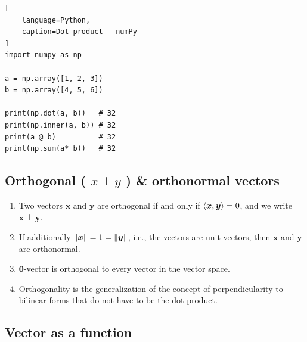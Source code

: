 \begin{lstlisting}[
    language=Python,
    caption=Dot product - numPy
]
import numpy as np

a = np.array([1, 2, 3])
b = np.array([4, 5, 6])

print(np.dot(a, b))   # 32
print(np.inner(a, b)) # 32
print(a @ b)          # 32
print(np.sum(a* b))   # 32
\end{lstlisting}











\subsection{Orthogonal ( $x \perp y$ ) \& orthonormal vectors}

\begin{enumerate}
    \item
    \begin{definition}
        Two vectors $\bm{x}$ and $\bm{y}$ are orthogonal if and only if $\langle\bm{x}, \bm{y}\rangle = 0$, and we write $\bm{x} \perp \bm{y}$.
        \hfill \cite{mfml/book/mml/Deisenroth-Faisal-Ong}
    \end{definition}

    \item If additionally $\left\| \bm{x} \right\| = 1 = \left\| \bm{y} \right\|$, i.e., the vectors are unit vectors, then $\bm{x}$ and $\bm{y}$ are orthonormal.
    \hfill \cite{mfml/book/mml/Deisenroth-Faisal-Ong}

    \item $\bm{0}$-vector is orthogonal to every vector in the vector space.
    \hfill \cite{mfml/book/mml/Deisenroth-Faisal-Ong}

    \item Orthogonality is the generalization of the concept of perpendicularity to bilinear forms that do not have to be the dot product.
    \hfill \cite{mfml/book/mml/Deisenroth-Faisal-Ong}
\end{enumerate}




\subsection{Vector as a function}


